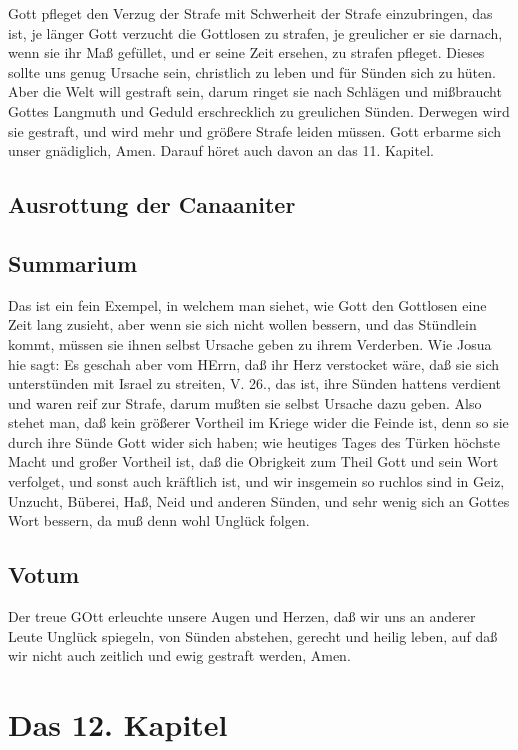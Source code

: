 Gott pfleget den Verzug der Strafe mit Schwerheit der Strafe einzubringen, das ist, je länger Gott verzucht die Gottlosen zu strafen, je greulicher er sie darnach, wenn sie ihr Maß gefüllet, und er seine Zeit ersehen, zu strafen pfleget. Dieses sollte uns genug Ursache sein, christlich zu leben und für Sünden sich zu hüten. Aber die Welt will gestraft sein, darum ringet sie nach Schlägen und mißbraucht Gottes Langmuth und Geduld erschrecklich zu greulichen Sünden. Derwegen wird sie gestraft, und wird mehr und größere Strafe leiden müssen. Gott erbarme sich unser gnädiglich, Amen. Darauf höret auch davon an das 11. Kapitel.

\section{Ausrottung der Canaaniter}
\section{Summarium}

Das ist ein fein Exempel, in welchem man siehet, wie Gott den Gottlosen eine Zeit lang zusieht, aber wenn sie sich nicht wollen bessern, und das Stündlein kommt, müssen sie ihnen selbst Ursache geben zu ihrem Verderben. Wie Josua hie sagt: Es geschah aber vom HErrn, daß ihr Herz verstocket wäre, daß sie sich unterstünden mit Israel zu streiten, V. 26., das ist, ihre Sünden hattens verdient und waren reif zur Strafe, darum mußten sie selbst Ursache dazu geben. Also stehet man, daß kein größerer Vortheil im Kriege wider die Feinde ist, denn so sie durch ihre Sünde Gott wider sich haben; wie heutiges Tages des Türken höchste Macht und großer Vortheil ist, daß die Obrigkeit zum Theil Gott und sein Wort verfolget, und sonst auch kräftlich ist, und wir insgemein so ruchlos sind in Geiz, Unzucht, Büberei, Haß, Neid und anderen Sünden, und sehr wenig sich an Gottes Wort bessern, da muß denn wohl Unglück folgen.

\section{Votum}

Der treue GOtt erleuchte unsere Augen und Herzen, daß wir uns an anderer Leute Unglück spiegeln, von Sünden abstehen, gerecht und heilig leben, auf daß wir nicht auch zeitlich und ewig gestraft werden, Amen.
\chapter{Das 12. Kapitel}

